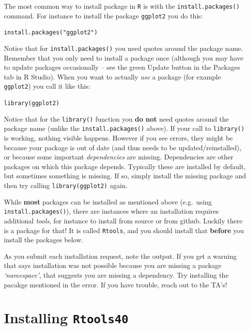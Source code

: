 \documentclass[
]{book}
\newenvironment{rmdcaution}[1]
  {
  \begin{itemize}
  \renewcommand{\labelitemi}{
    \raisebox{-.7\height}[0pt][0pt]{
      {\setkeys{Gin}{width=3em,keepaspectratio}\texttt{[image: images/\#1]}}
    }
  }
  \setlength{\fboxsep}{1em}
  \begin{blackbox}
  \item
  }
  {
  \end{blackbox}
  \end{itemize}
  }
\begin{document}
The most common way to install package in \texttt{R} is with the \texttt{install.packages()} command. For instance to install the package \texttt{ggplot2} you do this:

\texttt{install.packages("ggplot2")}

Notice that for \texttt{install.packages()} you need quotes around the package name. Remember that you only need to install a package once (although you may have to update packages occasionally -- see the green Update button in the Packages tab in R Studio). When you want to actually \emph{use} a package (for example \texttt{ggplot2}) you call it like this:

\texttt{library(ggplot2)}

Notice that for the \texttt{library()} function you \textbf{do not} need quotes around the package name (unlike the \texttt{install.packages()} above). If your call to \texttt{library()} is working, nothing visible happens. However if you see errors, they might be because your package is out of date (and thus needs to be updated/reinstalled), or because some important \emph{dependencies} are missing. Dependencies are other packages on which this package depends. Typically these are installed by default, but sometimes something is missing. If so, simply install the missing package and then try calling \texttt{library(ggplot2)} again.

While \textbf{most} packages can be installed as mentioned above (e.g.~using \texttt{install.packages()}), there are instances where an installation requires additional \emph{tools}, for instance to install from source or from github. Luckily there is a package for that! It is called \texttt{Rtools}, and you should install that \textbf{before} you install the packages below.

\begin{rmdcaution}{caution}
As you submit each installation request, note the output. If you get a warning that says installation was not possible because you are missing a package \emph{`namespace'}, that suggests you are missing a dependency. Try installing the pacakge mentioned in the error. If you have trouble, reach out to the TA's!

\end{rmdcaution}

\hypertarget{installing-rtools40}{%
\section*{\texorpdfstring{Installing \texttt{Rtools40}}{Installing Rtools40}}\label{installing-rtools40}}
\end{document}
